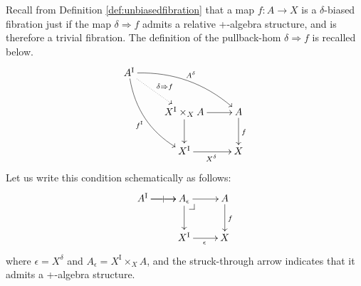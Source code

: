 \documentclass[11pt,reqno]{amsart}
\makeatletter
\newcommand{\ra}{\ensuremath{\rightarrow}}
\newcommand{\pbh}[2]{#1\!\Rightarrow\!#2}
\newcommand{\I}{\ensuremath{\mathrm{I}}}
\theoremstyle{remark}
\theoremstyle{definition}
\newcommand{\pbcorner}[1][dr]{\save*!/#1-1.2pc/#1:(-1,1)@^{|-}\restore}
\makeatother
\begin{document}
Recall from Definition \ref{def:unbiasedfibration} that a map $f:A\ra X$  is a $\delta$-biased fibration just if the map $\delta \Rightarrow f$ admits a relative +-algebra structure, and is therefore a trivial fibration.  The definition of the pullback-hom $\pbh{\delta}{f}$ is recalled below.
\begin{equation}\label{diagram:frobenius1}
\xymatrix{
A^\I \ar@/_3ex/ [rdd]_{f^\I} \ar@{.>}[rd]^{\delta\Rightarrow{f}} \ar@/^3ex/ [rrd]^{A^{\delta}}  && \\
& X^\I \times_{X} A \ar[d] \ar[r] & A \ar[d]^{f} \\
& X^\I \ar[r]_{X^{\delta}} &  X
}
\end{equation}
Let us write this condition schematically as follows:
\begin{equation}\label{diagram:frobenius2}
\xymatrix{
A^\I \ar[r]|| \ar[r]  & A_\epsilon\ar[d] \pbcorner \ar[r] & A \ar[d]^f \\
& X^\I \ar[r]_{\epsilon} &  X
}
\end{equation}
where $\epsilon = X^{\delta}$ and $A_\epsilon = X^\I \times_{X} A$, and the struck-through arrow indicates that it admits a +-algebra structure.
\end{document}
